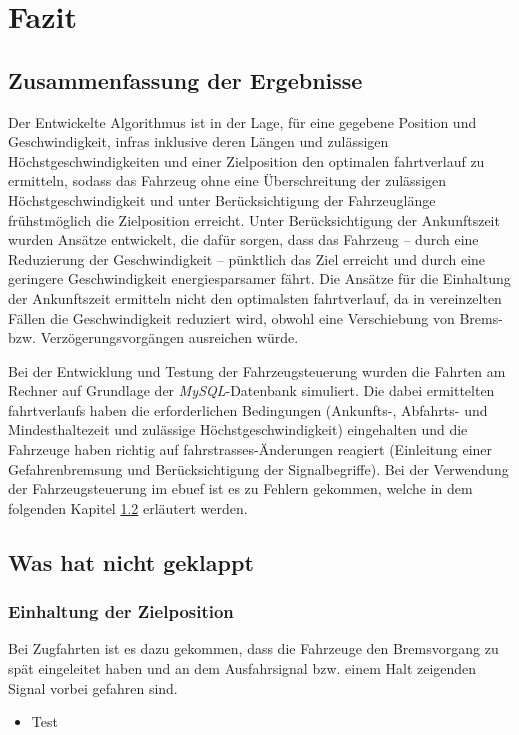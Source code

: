 \section{Fazit}
\subsection{Zusammenfassung der Ergebnisse}
Der Entwickelte Algorithmus ist in der Lage, für eine gegebene Position und Geschwindigkeit, \acp{infra} inklusive deren Längen und zulässigen Höchstgeschwindigkeiten und einer Zielposition den optimalen \Gls{fahrtverlauf} zu ermitteln, sodass das Fahrzeug ohne eine Überschreitung der zulässigen Höchstgeschwindigkeit und unter Berücksichtigung der Fahrzeuglänge frühstmöglich die Zielposition erreicht. Unter Berücksichtigung der Ankunftszeit wurden Ansätze entwickelt, die dafür sorgen, dass das Fahrzeug -- durch eine Reduzierung der Geschwindigkeit -- pünktlich das Ziel erreicht und durch eine geringere Geschwindigkeit energiesparsamer fährt. Die Ansätze für die Einhaltung der Ankunftszeit ermitteln nicht den optimalsten \Gls{fahrtverlauf}, da in vereinzelten Fällen die Geschwindigkeit reduziert wird, obwohl eine Verschiebung von Brems- bzw. Verzögerungsvorgängen ausreichen würde.

Bei der Entwicklung und Testung der Fahrzeugsteuerung wurden die Fahrten am Rechner auf Grundlage der \textit{MySQL}-Datenbank simuliert. Die dabei ermittelten \Glspl{fahrtverlauf} haben die erforderlichen Bedingungen (Ankunfts-, Abfahrts- und Mindesthaltezeit und zulässige Höchstgeschwindigkeit) eingehalten und die Fahrzeuge haben richtig auf \Glspl{fahrstrasse}-Änderungen reagiert (Einleitung einer Gefahrenbremsung und Berücksichtigung der Signalbegriffe). Bei der Verwendung der Fahrzeugsteuerung im \ac{ebuef} ist es zu Fehlern gekommen, welche in dem folgenden Kapitel \ref{fazit2} erläutert werden.
\subsection{Was hat nicht geklappt} \label{fazit2}
\subsubsection{Einhaltung der Zielposition}
Bei Zugfahrten ist es dazu gekommen, dass die Fahrzeuge den Bremsvorgang zu spät eingeleitet haben und an dem Ausfahrsignal bzw. einem Halt zeigenden Signal vorbei gefahren sind. 
\begin{itemize}
\item Test
\end{itemize}
